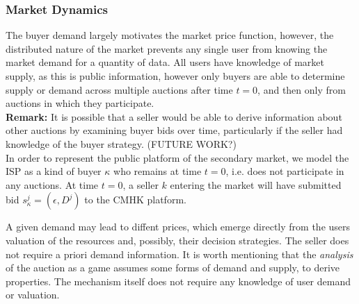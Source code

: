\documentclass[12pt]{article}
\theoremstyle{definition}
\begin{document}
\begin{multicols}{2}
\subsubsection{Market Dynamics}
The buyer demand largely motivates the market price function, however, the
distributed nature of the market prevents any single user from knowing the
market demand for a quantity of data. All users have knowledge of market
supply, as this is public information, however only buyers
are able to determine supply or demand across multiple auctions after time $t=0$, and then only from auctions
in which they participate. \\
\textbf{Remark:}
It is possible that a seller would be able to derive information about other
auctions by examining buyer bids over time, particularly if the seller had knowledge of the
buyer strategy. (FUTURE WORK?)\\
In order to represent the public platform of the secondary market, we model the ISP as
a kind of buyer $\kappa$ who remains at time $t=0$, i.e. does not participate
in any auctions. At time $t=0$, a seller $k$ entering the market will have submitted bid
$s_\kappa^j =(\epsilon, D^j)$ to the CMHK platform.

A given demand may lead to diffent prices, which emerge directly from the users valuation
of the resources and, possibly, their decision strategies. The seller does not
require a priori demand information.
It is worth mentioning that the \emph{analysis} of the auction as
a game assumes some forms of demand and supply, to derive properties.
The mechanism itself does not require any knowledge of user demand or
valuation. 
\iffalse
The ISP overage
charge inducing an upper bound on the sellers' reserve prices implies that
supply will always be greater than demand, thereby reducing the sellers'
influence on market dynamics.
\fi


\end{multicols}
\end{document}
